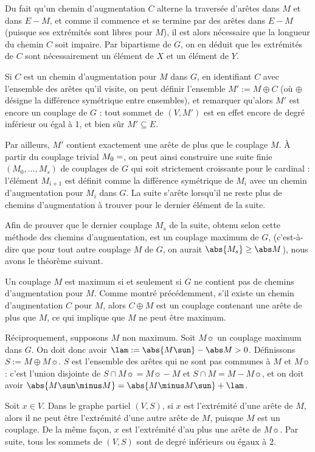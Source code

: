 Du fait qu'un chemin d'augmentation $C$ alterne la traversée d'arêtes dans $M$ et dans $E\minus M$, et comme il commence et se termine par des arêtes dans $E\minus M$ (puisque ses extrémités sont libres pour $M$), il est alors nécessaire que la longueur du chemin $C$ soit impaire. Par bipartisme de $G$, on en déduit que les extrémités de $C$ sont nécessairement un élément de $X$ et un élément de $Y$.
 
 Si $C$ est un chemin d'augmentation pour $M$ dans $G$, en identifiant $C$ avec l'ensemble des arêtes qu'il visite, on peut définir l'ensemble $M' := M \oplus C$ (où $\oplus$ désigne la différence symétrique entre ensembles), et remarquer qu'alors $M'$ est encore un couplage de $G$ : tout sommet de $(V, M')$ est en effet encore de degré inférieur ou égal à 1, et bien sûr $M' \subseteq E$.
 
 Par ailleurs, $M'$ contient exactement une arête de plus que le couplage $M$. À partir du couplage trivial $M_0 = \empty$, on peut ainsi construire une suite finie $(M_0,\dots,M_s)$ de couplages de $G$ qui soit strictement croissante pour le cardinal : l'élément $M_{i+1}$ est définit comme la différence symétrique de $M_i$ avec un chemin d'augmentation pour $M_i$ dans $G$. La suite s'arête lorsqu'il ne reste plus de chemins d'augmentation à trouver pour le dernier élément de la suite.
 
 Afin de prouver que le dernier couplage $M_s$ de la suite, obtenu selon cette méthode des chemins d'augmentation, est un couplage maximum de $G$, (c'est-à-dire que pour tout autre couplage $M$ de $G$, on aurait $\abs{M_s} \geq \abs M$), nous avons le théorème suivant.
 
 \SEP{}
    Un couplage $M$ est maximum si et seulement si $G$ ne contient pas de chemins d'augmentation pour $M$.
 \SEP\jpreuve
    Comme montré précédemment, s'il existe un chemin d'augmentation $C$ pour $M$, alors $C \oplus M$ est un couplage contenant une arête de plus que $M$, ce qui implique que $M$ ne peut être maximum.
    
    Réciproquement, supposons $M$ non maximum. Soit $M\sun$ un couplage maximum dans $G$. On doit donc avoir $\lam := \abs {M\sun} - \abs M > 0$. Définissons $S := M \oplus M\sun$. $S$ est l'ensemble des arêtes qui ne sont pas communes à $M$ et $M\sun$ : c'est l'union disjointe de $S \cap M\sun = M\sun \minus M$ et $S \cap M = M \minus M\sun$, et on doit avoir $\abs{M\sun \minus M} = \abs{M \minus M\sun}+\lam$.
    
    Soit $x \in V$. Dans le graphe partiel $(V, S)$, si $x$ est l'extrémité d'une arête de $M$, alors il ne peut être l'extrémité d'une autre arête de $M$, puisque $M$ est un couplage. De la même façon, $x$ est l'extrémité d'au plus une arête de $M\sun$. Par suite, tous les sommets de $(V,S)$ sont de degré inférieurs ou égaux à 2.
    
